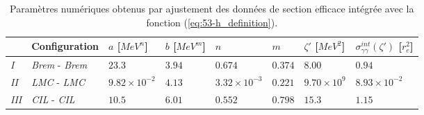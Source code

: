 \begin{refsection}
\begin{table}
    \centering
    \begin{tabular}{ | l | l | l | l | l | l | l | l |}
    \hline
                & Configuration   & $a$ [$MeV^n$]        & $b$ [$MeV^m$] & $n$                  & $m$     & $\zeta'$ [$MeV^2$] & $\sigma_{\gamma\gamma}^{int}(\zeta')$ [$r_e^2$] \\
    \hline
     \textit{I}   & \textit{Brem} - \textit{Brem} & $23.3$               & $3.94$        & $0.674$              & $0.374$ & $8.00$             & $0.94$                                          \\
     \textit{II}  & \textit{LMC} - \textit{LMC}   & $9.82\times 10^{-2}$ & $4.13$        & $3.32\times 10^{-3}$ & $0.221$ & $9.70\times 10^9$  & $8.93 \times 10^{-2}$                           \\
     \textit{III} & \textit{CIL} - \textit{CIL}   & $10.5$               & $6.01$        & $0.552$              & $0.798$ & $15.3$             & $1.15$                                          \\
    \hline
    \end{tabular}
	\caption{Paramètres numériques obtenus par ajustement des données de section efficace intégrée avec la fonction (\ref{eq:53-h_definition}).}
	\label{tab:53-h_fit}
\end{table}


\end{refsection}
